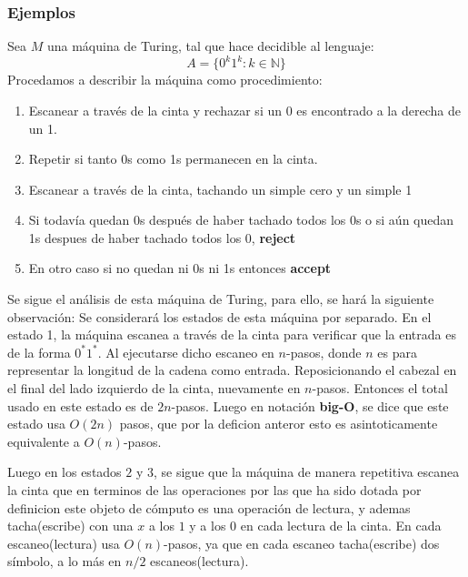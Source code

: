 \documentclass[10pt]{report}
\begin{document}
    \subsubsection{Ejemplos}
    Sea $M$ una máquina de Turing, tal que hace decidible al lenguaje:
    \begin{equation}
        A = \{0^{k}1^{k} : k\in \mathbb{N} \}\label{eq:equation12}
    \end{equation}
    Procedamos a describir la máquina como procedimiento:
    \begin{enumerate}
        \item Escanear a través de la cinta y rechazar si un 0 es encontrado a la derecha de un 1.
        \item Repetir si tanto 0s como 1s permanecen en la cinta.
        \item Escanear a través de la cinta, tachando un simple cero y un simple 1
        \item Si todavía quedan 0s después de haber tachado todos los 0s o si aún quedan 1s despues de haber tachado todos los 0, \textbf{reject}
        \item En otro caso si no quedan ni 0s ni 1s entonces \textbf{accept}
    \end{enumerate}
    \hfil
    Se sigue el análisis de esta máquina de Turing, para ello, se hará la siguiente observación:
    \newline
    Se considerará los estados de esta máquina por separado.
    En el estado 1, la máquina escanea a través de la cinta para verificar que la entrada es de la forma $0^{*}1^{*}$.
    Al ejecutarse dicho escaneo en $n$-pasos, donde $n$ es para representar la longitud de la cadena como entrada.
    Reposicionando el cabezal en el final del lado izquierdo de la cinta, nuevamente en $n$-pasos.
    Entonces el total usado en este estado es de $2n$-pasos.
    Luego en notación \textbf{big-O}, se dice que este estado usa $O(2n)$ pasos, que por la deficion anteror esto es
    asintoticamente equivalente a $O(n)$-pasos.\newline

    Luego en los estados $2$ y $3$, se sigue que la máquina de manera repetitiva escanea la cinta que en terminos
    de las operaciones por las que ha sido dotada por definicion este objeto de cómputo es una operación de lectura,
    y ademas tacha(escribe) con una $x$ a los $1$ y a los $0$ en cada lectura de la cinta.
    En cada escaneo(lectura) usa $O(n)$-pasos, ya que en cada escaneo tacha(escribe) dos símbolo, a lo más en $n/2$ escaneos(lectura).\newline
\end{document}
